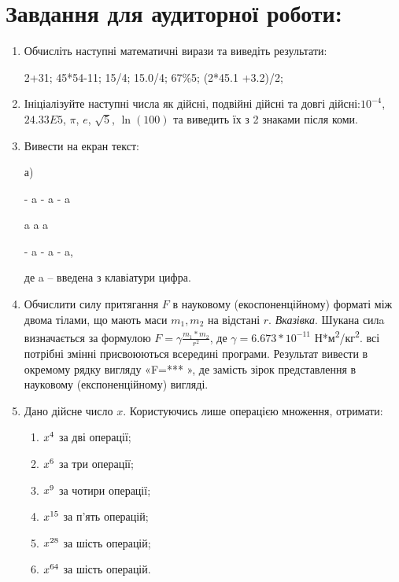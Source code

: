 \documentclass[a5paper,titlepage,openany,twoside,draft]{book_unv}%
\makeatletter
\newcommand{\xslalph}[1]{\expandafter\@xslalph\csname c@#1\endcsname}
\newcommand{\@xslalph}[1]{%
    \ifcase#1\or а\or б\or в\or г\or д\or e\or є\or ж\or з\or i%
    \or й\or к\or л\or м\or н\or о\or п\or р\or с\or т%
    \or у\or ф\or х\or ц\or ч\or ш\or ю\or я\or аа\or бб\or вв%
    \else\@ctrerr\fi%
}
\makeatother
\begin{document}
\section{Завдання для аудиторної роботи:}

\begin{enumerate}
\def\labelenumi{\arabic{enumi}.}
\item
  Обчисліть наступні математичні вирази та виведіть результати:

2+31; 45*54-11; 15/4; 15.0/4; 67\%5; (2*45.1 +3.2)/2;

\item
  Ініціалізуйте наступні числа як дійсні, подвійні дійсні та довгі
  дійсні:$10^{-4}$, $24.33E5$, $\pi$, $e$, $\sqrt{5}$,
  $\ln(100)$ та виведить їх з 2 знаками після коми.

\item
  Вивести на екран текст:

а) 

-\/ a -\/ a -\/ a

a \textbar{} a \textbar{} a

-\/ a -\/ a -\/ a,

де a -- введена з клавіатури цифра.

\item
  Обчислити силу притягання $F$ в науковому (екоспоненційному) форматі між двома тілами,
  що мають маси $m_{1},m_{2}$ на відстані $r$. 
  \emph{\emph{Вказівка}}. Шукана силa визначається за формулою 
  $ F=\gamma \frac{m_{1}*m_{2}}{r^{2}}$,
  де $\gamma = 6.673*10^{-11}$ Н*м\textsuperscript{2}/кг\textsuperscript{2}. всі потрібні змінні
  присвоюються всередині програми. Результат вивести в окремому рядку
  вигляду «F=*** », де замість зірок представлення в науковому
  (експоненційному) вигляді.

\item
  Дано дійсне число \(x\). Користуючись лише операцією множення,
  отримати:
  \begin{multicols}{2}
  \begin{enumerate}[label=\xslalph*)]
  \item  \(x\textsuperscript{4}\) за дві операції; 
  \item  \(x\textsuperscript{6}\) за три операції;
  \item \(x\textsuperscript{9}\) за чотири операції; 
  \item \(x\textsuperscript{15}\) за п'ять операцій;
  \item \(x\textsuperscript{28}\) за шість операцій; 
  \item \(x\textsuperscript{64}\) за шість операцій.
  \end{enumerate}
  \end{multicols}


\end{enumerate}
\end{document}
